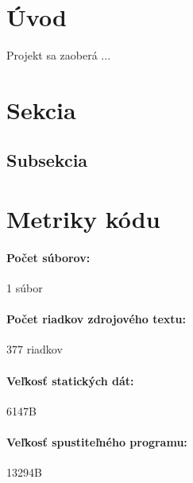 \documentclass[12pt,a4paper,titlepage,final]{article}
\begin{document}

\def\author{TODO}
\def\email{xloginXX@stud.fit.vutbr.cz}
\def\projname{Interpret jazyka IFJ14}



\pagestyle{plain}
\setcounter{page}{1}
\tableofcontents

\newpage
\pagestyle{plain}
\setcounter{page}{1}

\section{Úvod} \label{uvod}

Projekt sa zaoberá ...

\section{Sekcia} \label{analyza}

\subsection{Subsekcia}\label{zadanie}

\appendix

\section{Metriky kódu} \label{metriky}
\paragraph{Počet súborov:} 1 súbor
\paragraph{Počet riadkov zdrojového textu:} 377 riadkov
\paragraph{Veľkosť statických dát:} 6147B
\paragraph{Veľkosť spustiteľného programu:} 13294B
\end{document}
